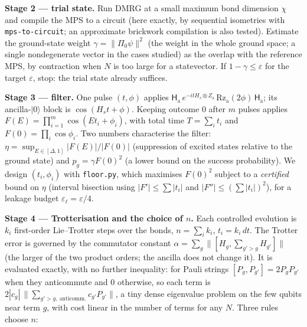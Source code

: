 \documentclass[
]{article}
\begin{document}
\textbf{Stage 2 --- trial state.} Run DMRG at a small maximum bond
dimension \(\chi\) and compile the MPS to a circuit (here exactly, by
sequential isometries with \texttt{mps-to-circuit}; an approximate
brickwork compilation is also tested). Estimate the ground-state weight
\(\gamma=\|\Pi_0\psi\|^2\) (the weight in the whole ground space; a
single nondegenerate vector in the cases studied) as the overlap with
the reference MPS, by contraction when \(N\) is too large for a
statevector. If \(1-\gamma\le\varepsilon\) for the target
\(\varepsilon\), stop: the trial state already suffices.

\textbf{Stage 3 --- filter.} One pulse \((t,\phi)\) applies
\(\mathsf H_{\mathrm{a}}\,e^{-itH_s\otimes Z_{\mathrm{a}}}\,\mathrm{Rz}_{\mathrm{a}}(2\phi)\,\mathsf H_{\mathrm{a}}\);
its ancilla-\(|0\rangle\) block is \(\cos(H_st+\phi)\). Keeping outcome
\(0\) after \(m\) pulses applies
\(F(E)=\prod_{i=1}^m\cos(Et_i+\phi_i)\), with total time \(T=\sum_it_i\)
and \(F(0)=\prod_i\cos\phi_i\). Two numbers characterise the filter:
\(\eta=\sup_{E\in[\Delta,1]}|F(E)|/|F(0)|\) (suppression of excited
states relative to the ground state) and \(p_g=\gamma F(0)^2\) (a lower
bound on the success probability). We design \((t_i,\phi_i)\) with
\texttt{floor.py}, which maximises \(F(0)^2\) subject to a
\emph{certified} bound on \(\eta\) (interval bisection using
\(|F'|\le\sum|t_i|\) and \(|F''|\le(\sum|t_i|)^2\)), for a leakage
budget \(\varepsilon_\ell=\varepsilon/4\).

\textbf{Stage 4 --- Trotterisation and the choice of \(n\).} Each
controlled evolution is \(k_i\) first-order Lie--Trotter steps over the
bonds, \(n=\sum_ik_i\), \(t_i=k_i\,dt\). The Trotter error is governed
by the commutator constant
\(\alpha=\sum_g\big\|[H_g,\sum_{g'>g}H_{g'}]\big\|\) (the larger of the
two product orders; the ancilla does not change it). It is evaluated
exactly, with no further inequality: for Pauli strings
\([P_g,P_{g'}]=2P_gP_{g'}\) when they anticommute and \(0\) otherwise,
so each term is
\(2|c_g|\,\|\sum_{g'>g,\ \text{anticomm.}}c_{g'}P_{g'}\|\), a tiny dense
eigenvalue problem on the few qubits near term \(g\), with cost linear
in the number of terms for any \(N\). Three rules choose \(n\):
\end{document}
